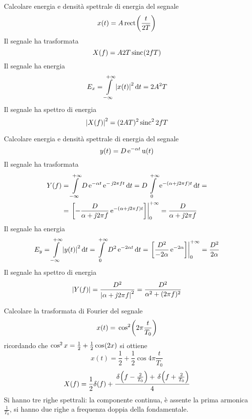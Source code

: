 \begin{esercizio}
Calcolare energia e densità spettrale di energia del segnale
\[x(t)=A\rect{\frac{t}{2T}}\]
Il segnale ha trasformata 
\[X(f)=A 2 T \sinc{2 f T}\]
Il segnale ha energia
\[E_x=\intinf{\abs{x(t)}^2}{t}=2 A^2 T\]
Il segnale ha spettro di energia
\[\abs{X(f)}^2=(2 A T)^2\Sinc^2{2 f T}\]
\end{esercizio}

\begin{esercizio}
Calcolare energia e densità spettrale di energia del segnale
\[y(t)=D\e{-\alpha t}\step(t)\]
Il segnale ha trasformata
\begin{align*}
Y(f)&=\intinf{ D\e{-\alpha t}\e{-\imath 2\pi f t}}{t}=D\intd{0}{+\infty}{\e{-(\alpha+\imath 2\pi f)t}}{t}=\\
&=\bound{0}{+\infty}{-\frac{D}{\alpha+\imath 2\pi f}\e{-(\alpha+\imath 2\pi f)t}}=\frac{D}{\alpha+\imath 2\pi f}
\end{align*}
Il segnale ha energia
\[E_y=\intinf{\abs{y(t)}^2}{t}=\intd{0}{+\infty}{D^2\e{-2\alpha t}}{t}=\bound{0}{+\infty}{\frac{D^2}{-2\alpha}\e{-2\alpha}}=\frac{D^2}{2\alpha}\]
Il segnale ha spettro di energia
\[\abs{Y(f)}=\frac{D^2}{\abs{\alpha+\imath 2\pi f}^2}=\frac{D^2}{\alpha^2+(2\pi f)^2}\]
\end{esercizio}

\begin{esercizio}
Calcolare la trasformata di Fourier del segnale
\[x(t)=\f{\Cos^2}{2\pi\frac{t}{T_0}}\]
ricordando che $\Cos^2 x=\frac{1}{2}+\frac{1}{2}\cos{2x}$ si ottiene
\[x(t)=\frac{1}{2}+\frac{1}{2}\cos{4\pi\frac{t}{T_0}}\]
\[X(f)=\frac{1}{2}\delta(f)+\frac{\f{\delta}{f-\frac{2}{T_0}}+\f{\delta}{f+\frac{2}{T_0}}}{4}\]
Si hanno tre righe spettrali: la componente continua, è assente la prima armonica $\frac{1}{T_0}$, si hanno due righe a frequenza doppia della fondamentale.
\begin{figure}[!ht]
\centering
{}
\end{figure}
\end{esercizio}
